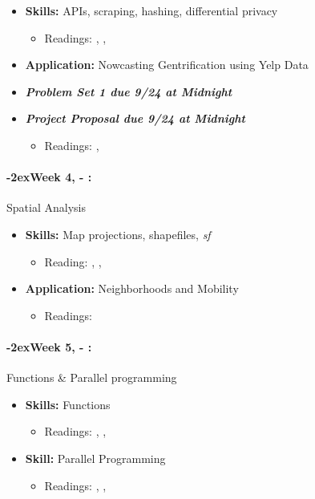 \documentclass[11pt]{article}
\newcommand{\week}[1]{%
  \paragraph*{\kern-2ex\quad #1, \AdvanceDate[1]\syldate{\today} - \AdvanceDate[2]\syldate{\today}:}%
  \ifdim\wd1=\wd\MONDAY
    \AdvanceDate[7]
  \else
    \AdvanceDate[7]
  \fi%
}
\begin{document}
\begin{itemize}
\item \textbf{Skills:} APIs, scraping, hashing, differential privacy
\begin{itemize}
  \item Readings: \textbf{\cite{chetty2019privacy}}, \cite{abowd2019privacy}, \cite{apiintro}
\end{itemize}
\item \textbf{Application:} Nowcasting Gentrification using Yelp Data
\item \textit{\textbf{Problem Set 1 due 9/24 at Midnight}}
\item \textit{\textbf{Project Proposal due 9/24 at Midnight}}
\begin{itemize}
  \item Readings: \textbf{\cite{glaeser2018gentrification}}, \cite{glaeser2017local}
\end{itemize}
\end{itemize} 
\week{Week 4} Spatial Analysis
\begin{itemize}
  \item \textbf{Skills:} Map projections, shapefiles, \textit{sf}
  \begin{itemize}
    \item Reading: \textbf{\cite{mcdermott2023spatial}}, \cite{crs}, \cite{lovelace2019geographic}
  \end{itemize}
  \item \textbf{Application:} Neighborhoods and Mobility
  \begin{itemize}
    \item Readings: \textbf{\cite{chetty2018opportunityatlas}}
  \end{itemize}
\end{itemize}
\week{Week 5} Functions \& Parallel programming
\begin{itemize}
  \item \textbf{Skills:} Functions
  \begin{itemize}
    \item Readings: \cite{mcdermott2023functionsintro}, \cite{mcdermott2023functionsadvanced} \cite{wickham2023meta}, \cite{tidyeval}
  \end{itemize}
  \item \textbf{Skill:} Parallel Programming
  \begin{itemize}
    \item Readings: \textbf{\cite{mcdermott2023parallel}}, \cite{eddelbuettel2020parallel}, \cite{mcdermott2023parallel}
  \end{itemize}
\end{itemize}
\end{document}

